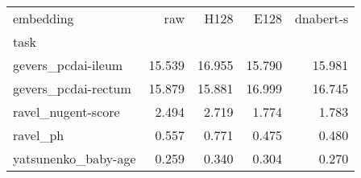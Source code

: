 \begin{tabular}{lrrrr}
\toprule
embedding & raw & H128 & E128 & dnabert-s \\
task &  &  &  &  \\
\midrule
gevers_pcdai-ileum & 15.539 & 16.955 & 15.790 & 15.981 \\
gevers_pcdai-rectum & 15.879 & 15.881 & 16.999 & 16.745 \\
ravel_nugent-score & 2.494 & 2.719 & 1.774 & 1.783 \\
ravel_ph & 0.557 & 0.771 & 0.475 & 0.480 \\
yatsunenko_baby-age & 0.259 & 0.340 & 0.304 & 0.270 \\
\bottomrule
\end{tabular}
